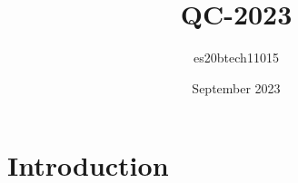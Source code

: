 \documentclass{article}
\title{QC-2023}
\author{es20btech11015 }
\date{September 2023}
\begin{document}
\maketitle

\section{Introduction}
\end{document}
